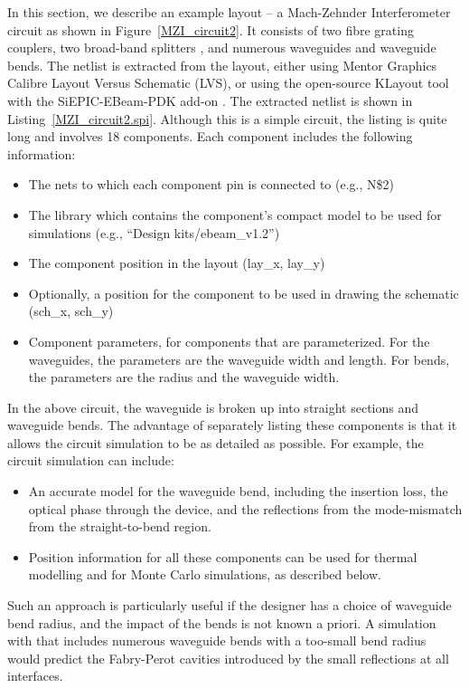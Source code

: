 \documentclass[journal]{spie}
\begin{document}
In this section, we describe an example layout -- a Mach-Zehnder Interferometer circuit as shown in Figure~\ref{MZI_circuit2}.  It consists of two fibre grating couplers, two broad-band splitters \cite{lu2015broadband}, and numerous waveguides and waveguide bends.  The netlist is extracted from the layout, either using Mentor Graphics Calibre Layout Versus Schematic (LVS), or using the open-source KLayout \cite{www_klayout} tool with the SiEPIC-EBeam-PDK add-on \cite{siepic-ebeam-pdk}.  The extracted netlist is shown in Listing~\ref{MZI_circuit2.spi}.  Although this is a simple circuit, the listing is quite long and involves 18 components.  
Each component includes the following information:
\begin{itemize}
\item The nets to which each component pin is connected to (e.g., N\$2)
\item The library which contains the component's compact model to be used for simulations (e.g., ``Design kits/ebeam\_v1.2'')
\item The component position in the layout (lay\_x, lay\_y)
\item Optionally, a position for the component to be used in drawing the schematic (sch\_x, sch\_y)
\item Component parameters, for components that are parameterized.  For the waveguides, the parameters are the waveguide width and length.    For bends, the parameters are the radius and the waveguide width.
\end{itemize}

In the above circuit, the waveguide is broken up into straight sections and waveguide bends.  The advantage of separately listing these components is that it allows the circuit simulation to be as detailed as possible.  For example, the circuit simulation can include:
\begin{itemize}
\item An accurate model for the waveguide bend, including the insertion loss, the optical phase through the device, and the reflections from the mode-mismatch from the straight-to-bend region.
\item Position information for all these components can be used for thermal modelling and for Monte Carlo simulations, as described below.
\end{itemize}
Such an approach is particularly useful if the designer has a choice of waveguide bend radius, and the impact of the bends is not known a priori.  A simulation with that includes numerous waveguide bends with a too-small bend radius would predict the Fabry-Perot cavities introduced by the small reflections at all interfaces.  
\end{document}
